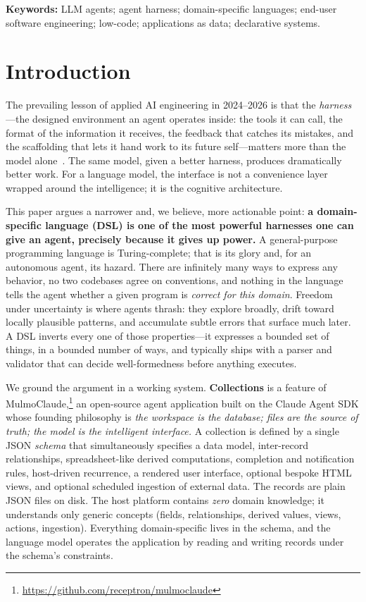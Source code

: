\documentclass[11pt]{article}
\begin{document}
\noindent\textbf{Keywords:} LLM agents; agent harness; domain-specific languages;
end-user software engineering; low-code; applications as data; declarative systems.

\section{Introduction}
\label{sec:intro}

The prevailing lesson of applied AI engineering in 2024--2026 is that the
\emph{harness}---the designed environment an agent operates inside: the tools it
can call, the format of the information it receives, the feedback that catches its
mistakes, and the scaffolding that lets it hand work to its future self---matters
more than the model alone~\citep{yang2024sweagent,yao2023react}. The same model,
given a better harness, produces dramatically better work. For a language model,
the interface is not a convenience layer wrapped around the intelligence; it is
the cognitive architecture.

This paper argues a narrower and, we believe, more actionable point: \textbf{a
domain-specific language (DSL) is one of the most powerful harnesses one can give
an agent, precisely because it gives up power.} A general-purpose programming
language is Turing-complete; that is its glory and, for an autonomous agent, its
hazard. There are infinitely many ways to express any behavior, no two codebases
agree on conventions, and nothing in the language tells the agent whether a given
program is \emph{correct for this domain}. Freedom under uncertainty is where
agents thrash: they explore broadly, drift toward locally plausible patterns, and
accumulate subtle errors that surface much later. A DSL inverts every one of those
properties---it expresses a bounded set of things, in a bounded number of ways,
and typically ships with a parser and validator that can decide well-formedness
before anything executes.

We ground the argument in a working system. \textbf{Collections} is a feature of
MulmoClaude,\footnote{\url{https://github.com/receptron/mulmoclaude}} an
open-source agent application built on the Claude Agent SDK whose
founding philosophy is \emph{the workspace is the database; files are the source
of truth; the model is the intelligent interface.} A collection is defined by a
single JSON \emph{schema} that simultaneously specifies a data model, inter-record
relationships, spreadsheet-like derived computations, completion and notification
rules, host-driven recurrence, a rendered user interface, optional bespoke HTML
views, and optional scheduled ingestion of external data. The records are plain
JSON files on disk. The host platform contains \emph{zero} domain knowledge; it
understands only generic concepts (fields, relationships, derived values, views,
actions, ingestion). Everything domain-specific lives in the schema, and the
language model operates the application by reading and writing records under the
schema's constraints.
\end{document}
